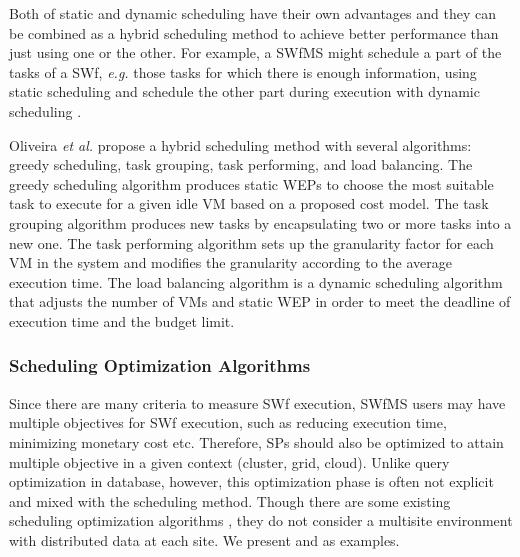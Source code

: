 Both of static and dynamic scheduling have their own advantages
and they can be combined as a hybrid scheduling method to achieve better performance
than just using one or the other. For example, a SWfMS might schedule a part
of the tasks of a SWf, \textit{e.g.} those tasks for which there is
enough information, using static scheduling and schedule the other part
during execution with dynamic scheduling \cite{Deng2011}.

Oliveira \textit{et al.} \cite{Oliveira2012a} propose a hybrid scheduling
method with several algorithms: greedy scheduling,
task grouping, task performing, and load balancing.
The greedy scheduling algorithm produces static WEPs
to choose the most suitable task to execute for a given idle VM
based on a proposed cost model. The task grouping algorithm produces
new tasks by encapsulating two or more tasks into a new one. The task
performing algorithm sets up the granularity factor for each VM in the
system and modifies the granularity according to the average execution
time. The load balancing algorithm is a dynamic scheduling algorithm that
adjusts the number of VMs and static WEP in order to meet
the deadline of execution time and the budget limit.


\subsubsection{Scheduling Optimization Algorithms}

Since there are many criteria to measure SWf execution, 
SWfMS users may have multiple objectives for SWf execution, such as reducing execution time, minimizing monetary cost etc.
Therefore, SPs should also be optimized to attain multiple objective in a given context (cluster, grid, cloud).
Unlike query optimization in database, however, this optimization phase is often not explicit and mixed with the scheduling method.
Though there are some existing scheduling optimization algorithms \cite{Oliveira2012a,Gu2013,Fard2014,Duan2014}, they do not consider a multisite environment with distributed data at each site.
We present \cite{Gu2013} and \cite{Fard2014} as examples. 

